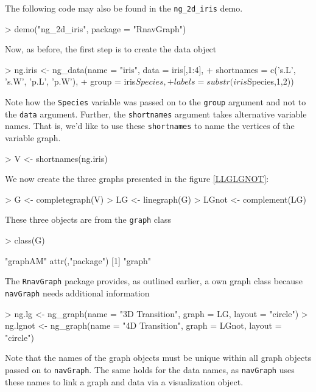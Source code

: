 \documentclass[12pt,oneside,titlepage,letter]{article}
\begin{document}
The following code may also be found in the \texttt{ng\_2d\_iris} demo.

\begin{Schunk}
\begin{Sinput}
> demo("ng_2d_iris", package = "RnavGraph")
\end{Sinput}
\end{Schunk}

Now, as before, the first step is to create the data object

\begin{Schunk}
\begin{Sinput}
> ng.iris <- ng_data(name = "iris", data = iris[,1:4],
+                    shortnames = c('s.L', 's.W', 'p.L', 'p.W'),
+                    group = iris$Species,
+                    labels = substr(iris$Species,1,2))
\end{Sinput}
\end{Schunk}

Note how the \texttt{Species} variable was passed on to the \texttt{group} argument and not to the \texttt{data} argument. Further, the \texttt{shortnames} argument takes alternative variable names. That is, we'd like to use these \texttt{shortnames} to name the vertices of the variable graph.
\begin{Schunk}
\begin{Sinput}
> V <- shortnames(ng.iris)
\end{Sinput}
\end{Schunk}
We now create the three graphs presented in the figure \ref{LLGLGNOT}:
\begin{Schunk}
\begin{Sinput}
> G <- completegraph(V)
> LG <- linegraph(G)
> LGnot <- complement(LG)
\end{Sinput}
\end{Schunk}
These three objects are from the \texttt{graph} class
\begin{Schunk}
\begin{Sinput}
> class(G)
\end{Sinput}
\begin{Soutput}
[1] "graphAM"
attr(,"package")
[1] "graph"
\end{Soutput}
\end{Schunk}
The \texttt{RnavGraph} package provides, as outlined earlier, a own graph class because \texttt{navGraph} needs additional information
\begin{Schunk}
\begin{Sinput}
> ng.lg <- ng_graph(name = "3D Transition", graph = LG, layout = "circle")
> ng.lgnot <- ng_graph(name = "4D Transition", graph = LGnot, layout = "circle")
\end{Sinput}
\end{Schunk}
Note that the names of the graph objects must be unique within all graph objects passed on to \texttt{navGraph}. The same holds for the data names, as \texttt{navGraph} uses these names to link a graph and data via a visualization object.\\
\end{document}
